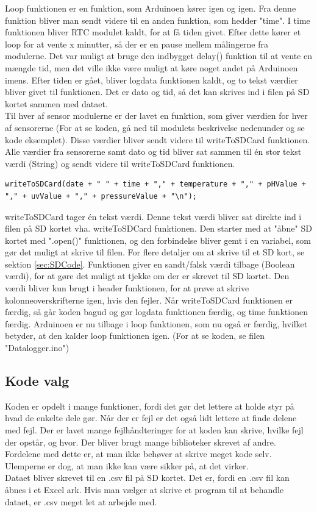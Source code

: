 		\newpage
		Loop funktionen er en funktion, som Arduinoen kører igen og igen. Fra denne funktion bliver man sendt videre til en anden funktion, som hedder "time". I time funktionen bliver RTC modulet kaldt, for at få tiden givet. Efter dette kører et loop for at vente x minutter, så der er en pause mellem målingerne fra modulerne. Det var muligt at bruge den indbygget delay() funktion til at vente en mængde tid, men det ville ikke være muligt at køre noget andet på Arduinoen imens. Efter tiden er gået, bliver logdata funktionen kaldt, og to tekst værdier bliver givet til funktionen. Det er dato og tid, så det kan skrives ind i filen på SD kortet sammen med dataet. \\ [7pt]
		Til hver af sensor modulerne er der lavet en funktion, som giver værdien for hver af sensorerne (For at se koden, gå ned til modulets beskrivelse nedenunder og se kode eksemplet). Disse værdier bliver sendt videre til writeToSDCard funktionen. Alle værdier fra sensorerne samt dato og tid bliver sat sammen til én stor tekst værdi (String) og sendt videre til writeToSDCard funktionen.
		\begin{lstlisting}
writeToSDCard(date + " " + time + "," + temperature + "," + pHValue + "," + uvValue + "," + pressureValue + "\n");
		\end{lstlisting}
		writeToSDCard tager én tekst værdi. Denne tekst værdi bliver sat direkte ind i filen på SD kortet vha. writeToSDCard funktionen. Den starter med at "åbne"{} SD kortet med ".open()"{} funktionen, og den forbindelse bliver gemt i en variabel, som gør det muligt at skrive til filen. For flere detaljer om at skrive til et SD kort, se sektion \ref{sec:SDCode}. Funktionen giver en sandt/falsk værdi tilbage (Boolean værdi), for at gøre det muligt at tjekke om der er skrevet til SD kortet. Den værdi bliver kun brugt i header funktionen, for at prøve at skrive kolonneoverskrifterne igen, hvis den fejler. Når writeToSDCard funktionen er færdig, så går koden bagud og gør logdata funktionen færdig, og time funktionen færdig. Arduinoen er nu tilbage i loop funktionen, som nu også er færdig, hvilket betyder, at den kalder loop funktionen igen. (For at se koden, se filen "Datalogger.ino")
		
	\subsection{Kode valg}
		Koden er opdelt i mange funktioner, fordi det gør det lettere at holde styr på hvad de enkelte dele gør. Når der er fejl er det også lidt lettere at finde delene med fejl. Der er lavet mange fejlhåndteringer for at koden kan skrive, hvilke fejl der opstår, og hvor. Der bliver brugt mange biblioteker skrevet af andre. Fordelene med dette er, at man ikke behøver at skrive meget kode selv. Ulemperne er dog, at man ikke kan være sikker på, at det virker. \\ [7pt]
		Dataet bliver skrevet til en .csv fil på SD kortet. Det er, fordi en .csv fil kan åbnes i et Excel ark. Hvis man vælger at skrive et program til at behandle dataet, er .csv meget let at arbejde med.